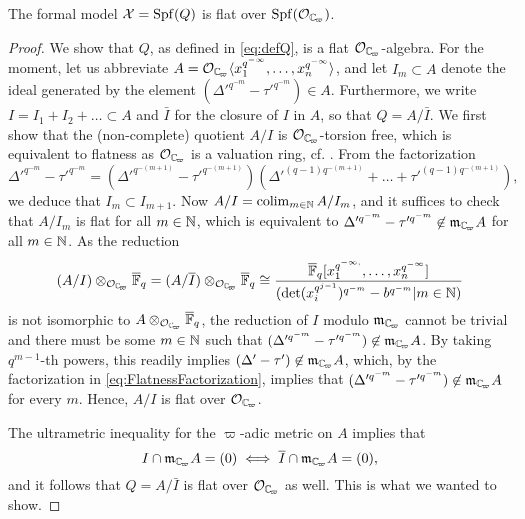 \documentclass[../main.tex]{subfiles}
\begin{document}
\begin{prop}\label{prop:FlatnessOfFormalModel}
  The formal model $\mathcal{X} = \operatorname{Spf}(Q)$ is flat over $\spf(\cO_\Cp)$. 
\begin{proof}
  We show that $Q$, as defined in \eqref{eq:defQ}, is a flat $\cO_\Cp$-algebra.
  For the moment, let us abbreviate $A = \cO_\Cp\langle x_1^{q^{-\infty}}, \dots, 
  x_n^{q^{-\infty}}\rangle$, 
  and let $I_m \subset A$ denote the ideal generated by the element 
  $(\Delta'^{q^{-m}} - \tau'^{q^{-m}}) \in A$. Furthermore, we write $I = I_1 +
  I_2 + \dots \subset A$ 
  and $\bar I$ for the closure of $I$ in $A$, so that $Q = A/\bar I$. 
  We first show that the (non-complete) quotient $A/I$ is $\cO_\Cp$-torsion free, 
  which is equivalent to flatness as $\cO_\Cp$ is a valuation ring,
  cf. \cite[\href{https://stacks.math.columbia.edu/tag/0539}{Tag
  0539}]{stacks-project}. From the factorization 
  \begin{equation}\label{eq:FlatnessFactorization}
    \Delta'^{q^{-m}} - \tau'^{q^{-m}} = (\Delta'^{q^{-(m+1)}} - \tau'^{q^{-(m+1)}})
    (\Delta'^{(q-1)q^{-(m+1)}} + \dots + \tau'^{(q-1)q^{-(m+1)}}),
  \end{equation}
  we deduce that $I_{m} \subset I_{m+1}$. Now $A/I = \operatorname*{colim}_{m \in \mathbb{N}} A/I_m$, and
  it suffices to check that $A/I_m$ is flat for all $m \in \mathbb{N}$, which is equivalent
  to $\Delta'^{q^{-m}} - \tau'^{q^{-m}} \not \in \fm_\Cp A$ for all
  $m \in \mathbb{N}$. As the reduction
  $$(A/I) \otimes_{\cO_\Cp} \Fqbar = (A/\bar I) \otimes_{\cO_\Cp}
  \Fqbar \cong \frac{\Fqbar [x_1^{q^{-\infty,}}, \dots,
    x_n^{q^{-\infty}}]}{(\det(x_i^{q^{j-1}})^{q^{-m}}- b^{q^{-m}} | m \in \N)}$$
  is not isomorphic to $A \otimes_{\cO_\Cp} \Fqbar$, the reduction of $I$ modulo
  $\fm_\Cp$ cannot be trivial and there must be some 
  $m \in \mathbb{N}$ such that $(\Delta'^{q^{-m}} - \tau'^{q^{-m}}) \not \in \fm_\Cp A$. 
  By taking $q^{m-1}$-th powers, this readily implies $(\Delta' - \tau') \not \in
  \fm_\Cp A$, which, by the factorization in \eqref{eq:FlatnessFactorization},
  implies that $(\Delta'^{q^{-m}} - \tau'^{q^{-m}}) \not \in \fm_\Cp A$ for every $m$. 
  Hence, $A/I$ is flat over $\cO_\Cp$. 

  The ultrametric inequality for the $\varpi$-adic metric on $A$ implies that 
  \begin{equation*}
    I \cap \fm_\Cp A = (0) \iff \bar I \cap \fm_\Cp A = (0),
  \end{equation*}
  and it follows that $Q = A/\bar I$ is flat over $\cO_\Cp$ as well. 
  This is what we wanted to show.
\end{proof}
\end{prop}
\end{document}
